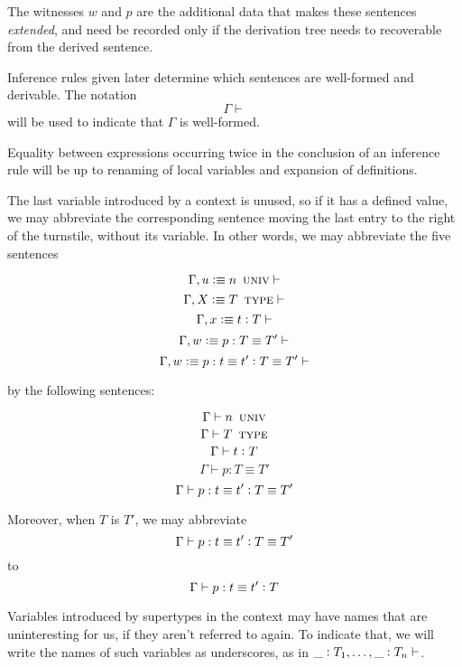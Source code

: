 \documentclass[11pt]{article}
\newcommand{\eqd}{\equiv}
\newcommand{\ccolon}{\vcentcolon}
\newcommand{\ccheck}{\vcentcolon}            %
\newcommand{\csynth}{\vcentcolon\vcentcolon} %
\renewcommand{\csynth}{\ccheck}              %
\newcommand{\Univ}{\mathop{\text{ \sc univ}}}
\newcommand{\TYPE}{\mathop{\text{ \sc type}}}
\newcommand{\Okay}{\mathop{\text{ \sc okay}}}
\newcommand{\Context}{\vdash\Okay}
\renewcommand{\Context}{\vdash}
\newcommand{\var}{\char`_}
\newcommand{\defn}{\vcentcolon\equiv}
\begin{document}
The witnesses $w$ and $p$ are the additional data that makes these sentences
{\em extended}, and need be recorded only if the derivation tree needs to
recoverable from the derived sentence.

Inference rules given later determine which sentences are well-formed and
derivable.  The notation $$\Gamma \Context$$ will be used to indicate that
$\Gamma$ is well-formed.

Equality between expressions occurring twice in the conclusion of an inference
rule will be up to renaming of local variables and expansion of definitions.

The last variable introduced by a context is unused, so if it has a defined
value, we may abbreviate the corresponding sentence moving the last entry to
the right of the turnstile, without its variable.  In other words, we may
abbreviate the five sentences

$$ \Gamma, u \defn n \Univ \Context $$
$$ \Gamma, X \defn T \TYPE \Context $$
$$ \Gamma, x \defn t \ccolon T \Context $$
$$ \Gamma, w \defn p : T \eqd T' \Context $$
$$ \Gamma, w \defn p : t \eqd t' \ccolon T \eqd T' \Context $$

by the following sentences:

$$ \Gamma \vdash n \Univ $$
$$ \Gamma \vdash T \TYPE $$
$$ \Gamma \vdash t \ccolon T $$
$$ \Gamma \vdash p : T \eqd T' $$
$$ \Gamma \vdash p : t \eqd t' \ccolon T \eqd T' $$

Moreover, when $T$ is $T'$, we may abbreviate
$$ \Gamma \vdash p : t \eqd t' \ccolon T \eqd T' $$
to
$$ \Gamma \vdash p : t \eqd t' \ccolon T $$

Variables introduced by supertypes in the context may have names that are
uninteresting for us, if they aren't referred to again.  To indicate that, we
will write the names of such variables as underscores, as in $\var
\ccolon T_1,\dots,\var \ccolon T_n\Context$.





\end{document}
